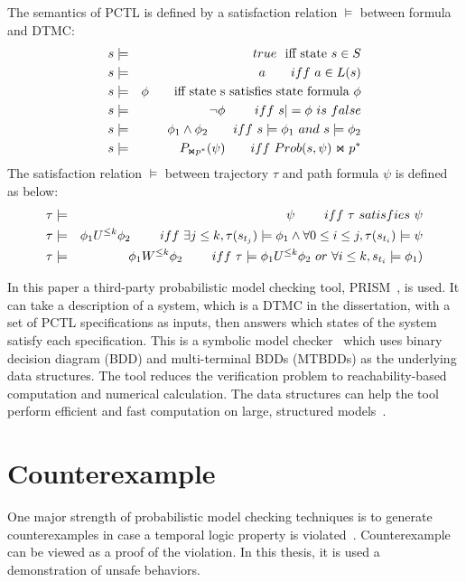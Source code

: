 The semantics of PCTL is defined by a satisfaction relation $\models$ between formula and DTMC:
\begin{eqnarray}
\centering
s&\models& true\ \ \text{iff state $s\in S$}\\
s&\models& a\qquad iff\ a\in L(s)\\
s&\models& \phi\qquad \text{iff state s satisfies state formula $\phi$}\\
s&\models& \neg\phi\qquad\ iff\ s|=\phi\ is\ false\\
s&\models& \phi_1\wedge\phi_2\qquad iff\ s\models\phi_1\ and\ s\models\phi_2\\
s&\models& P_{\Join p^*}(\psi)\qquad iff\ Prob(s, \psi)\Join p^*%
\end{eqnarray} 
The satisfaction relation $\models$ between trajectory $\tau$ and path formula $\psi$ is defined as below:
\begin{eqnarray}
\centering
\tau&\models& \psi\qquad\ iff\ \tau\ satisfies\ \psi\\
\tau&\models& \phi_1 U^{\leq k}\phi_2\qquad\ iff\ \exists j\leq k, \tau(s_{t_j})\models \phi_1 \wedge \forall 0\leq i\leq j, \tau(s_{t_i})\models \psi\\
\tau&\models& \phi_1 W^{\leq k}\phi_2\qquad\ iff\ \tau \models \phi_1 U^{\leq k}\phi_2\ or\ \forall i\leq k, s_{t_i}\models \phi_1)
\end{eqnarray} 

In this paper a third-party probabilistic model checking tool, PRISM~\cite{kwiatkowska2002prism}, is used. It can take a description of a system, which is a DTMC in the dissertation, with a set of PCTL specifications as inputs, then answers which states of the system satisfy each specification. This is a symbolic model checker~\cite{fujita1997multi} which uses binary decision diagram (BDD) and multi-terminal BDDs (MTBDDs) as the underlying data structures. The tool reduces the verification problem to reachability-based computation and numerical calculation. The data structures can help the tool perform efficient and fast computation on large, structured models~\cite{kwiatkowska2002prism}. 
\section{Counterexample}
One major strength of probabilistic model checking techniques is to generate counterexamples in case a temporal logic property is violated~\cite{4770111}. Counterexample can be viewed as a proof of the violation. In this thesis, it is used a demonstration of unsafe behaviors.

